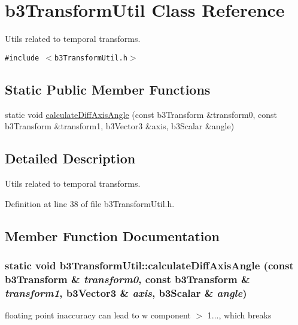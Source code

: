 \hypertarget{classb3_transform_util}{
\section{b3TransformUtil Class Reference}
\label{classb3_transform_util}
}
Utils related to temporal transforms.  


{\tt \#include $<$b3TransformUtil.h$>$}

\subsection*{Static Public Member Functions}
\begin{CompactItemize}
\item 
static void \hyperlink{classb3_transform_util_077905e76e231101930678ace3bd444a}{calculateDiffAxisAngle} (const b3Transform \&transform0, const b3Transform \&transform1, b3Vector3 \&axis, b3Scalar \&angle)
\end{CompactItemize}


\subsection{Detailed Description}
Utils related to temporal transforms. 

Definition at line 38 of file b3TransformUtil.h.

\subsection{Member Function Documentation}
\hypertarget{classb3_transform_util_077905e76e231101930678ace3bd444a}{
\subsubsection[calculateDiffAxisAngle]{\setlength{\rightskip}{0pt plus 5cm}static void b3TransformUtil::calculateDiffAxisAngle (const b3Transform \& {\em transform0}, \/  const b3Transform \& {\em transform1}, \/  b3Vector3 \& {\em axis}, \/  b3Scalar \& {\em angle})}}
\label{classb3_transform_util_077905e76e231101930678ace3bd444a}




floating point inaccuracy can lead to w component $>$ 1..., which breaks 

